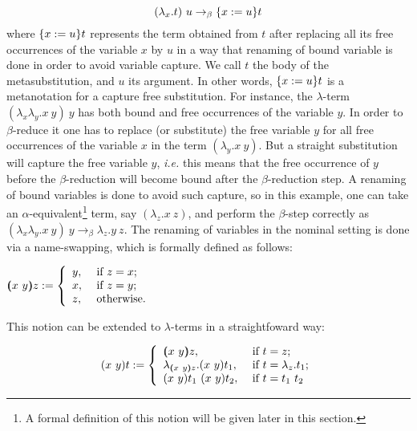 \begin{equation}\label{lambda:beta}
 (\lambda_x.t)\ u \to_{\beta} \metasub{t}{x}{u}
\end{equation}
\noindent where $\metasub{t}{x}{u}$ represents the term obtained from $t$ after replacing all its free occurrences of the variable $x$ by $u$ in a way that renaming of bound variable is done in order to avoid variable capture. We call $t$ the body of the metasubstitution, and $u$ its argument. In other words, $\metasub{t}{x}{u}$ is a metanotation for a capture free substitution. For instance, the $\lambda$-term $(\lambda_x\lambda_y.x\ y)\ y$ has both bound and free occurrences of the variable $y$. In order to $\beta$-reduce it one has to replace (or substitute) the free variable $y$ for all free occurrences of the variable $x$ in the term $(\lambda_y.x\ y)$. But a straight substitution will capture the free variable $y$, {\it i.e.} this means that the free occurrence of $y$ before the $\beta$-reduction will become bound after the $\beta$-reduction step. A renaming of bound variables is done to avoid such capture, so in this example, one can take an $\alpha$-equivalent\footnote{A formal definition of this notion will be given later in this section.} term, say $(\lambda_z.x\ z)$, and perform the $\beta$-step correctly as $(\lambda_x\lambda_y.x\ y)\ y \to_{\beta} \lambda_z.y\ z$. The renaming of variables in the nominal setting is done via a name-swapping, which is formally defined as follows:


$\vswap{x}{y}{z} := \left\{ \begin{array}{ll}
y, & \mbox{ if } z = x; \\
x, & \mbox{ if } z = y; \\
z, & \mbox{ otherwise. } \\
\end{array}\right.$


This notion can be extended to $\lambda$-terms in a straightfoward way:


\begin{equation}\label{def:swap}
\swap{x}{y}{t} := \left\{ \begin{array}{ll}
\vswap{x}{y}{z}, & \mbox{ if } t = z; \\
\lambda_{\vswap{x}{y}{z}}.\swap{x}{y}{t_1}, & \mbox{ if } t = \lambda_z.t_1; \\
\swap{x}{y}{t_1}\ \swap{x}{y}{t_2}, & \mbox{ if } t = t_1\ t_2\\
\end{array}\right.
\end{equation}


